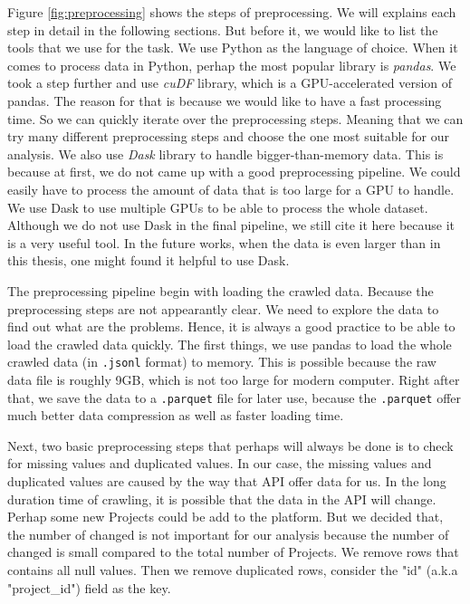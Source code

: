 Figure \ref{fig:preprocessing} shows the steps of preprocessing.
We will explains each step in detail in the following sections.
But before it, we would like to list the tools that we use for the task.
We use Python as the language of choice.
When it comes to process data in Python, perhap the most popular library is \textit{pandas}\parencite{pandas}.
We took a step further and use \textit{cuDF}\parencite{cudf} library, which is a GPU-accelerated version of pandas.
The reason for that is because we would like to have a fast processing time.
So we can quickly iterate over the preprocessing steps.
Meaning that we can try many different preprocessing steps and choose the one most suitable for our analysis.
We also use \textit{Dask}\parencite{dask} library to handle bigger-than-memory data.
This is because at first, we do not came up with a good preprocessing pipeline.
We could easily have to process the amount of data that is too large for a GPU to handle.
We use Dask to use multiple GPUs to be able to process the whole dataset.
Although we do not use Dask in the final pipeline, we still cite it here because it is a very useful tool.
In the future works, when the data is even larger than in this thesis, one might found it helpful to use Dask.

The preprocessing pipeline begin with loading the crawled data.
Because the preprocessing steps are not appearantly clear.
We need to explore the data to find out what are the problems.
Hence, it is always a good practice to be able to load the crawled data quickly.
The first things, we use pandas to load the whole crawled data (in \lstinline|.jsonl| format) to memory.
This is possible because the raw data file is roughly 9GB, which is not too large for modern computer.
Right after that, we save the data to a \lstinline|.parquet| file for later use,
because the \lstinline|.parquet| offer much better data compression as well as faster loading time.

Next, two basic preprocessing steps that perhaps will always be done is to check for missing values and duplicated values.
In our case, the missing values and duplicated values are caused by the way that API offer data for us.
In the long duration time of crawling, it is possible that the data in the API will change.
Perhap some new Projects could be add to the platform.
But we decided that, the number of changed is not important for our analysis because the number of changed is small compared to the total number of Projects.
We remove rows that contains all null values.
Then we remove duplicated rows, consider the "id" (a.k.a "project\_id") field as the key.


